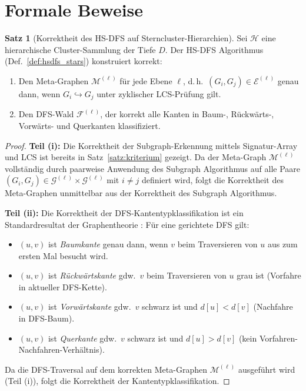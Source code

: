 ﻿\documentclass[a4paper,12pt]{report}
\theoremstyle{definition}
\newtheorem{satz}{Satz}
\begin{document}
\section{Formale Beweise}
\label{ssec:hsdfs_beweise}

\begin{satz}[Korrektheit des HS-DFS auf Sterncluster-Hierarchien]
\label{satz:hsdfs_korrektheit}
Sei $\mathcal{H}$ eine hierarchische Cluster-Sammlung der Tiefe $D$. Der HS-DFS Algorithmus (Def.~\ref{def:hsdfs_stars}) konstruiert korrekt:
\begin{enumerate}[label=(\roman*)]
    \item Den Meta-Graphen $\mathcal{M}^{(\ell)}$ für jede Ebene $\ell$, d.\,h.\ $(G_i, G_j) \in \mathcal{E}^{(\ell)}$ genau dann, wenn $G_i \hookrightarrow G_j$ unter zyklischer LCS-Prüfung gilt.
    \item Den DFS-Wald $\mathcal{F}^{(\ell)}$, der korrekt alle Kanten in Baum-, Rückwärts-, Vorwärts- und Querkanten klassifiziert.
\end{enumerate}
\end{satz}

\begin{proof}
\textbf{Teil (i):} Die Korrektheit der Subgraph-Erkennung mittels Signatur-Array und LCS ist bereits in Satz~\ref{satz:kriterium} gezeigt. Da der Meta-Graph $\mathcal{M}^{(\ell)}$ vollständig durch paarweise Anwendung des Subgraph Algorithmus auf alle Paare $(G_i, G_j) \in \mathcal{G}^{(\ell)} \times \mathcal{G}^{(\ell)}$ mit $i \neq j$ definiert wird, folgt die Korrektheit des Meta-Graphen unmittelbar aus der Korrektheit des Subgraph Algorithmus.

\textbf{Teil (ii):} Die Korrektheit der DFS-Kantentypklassifikation ist ein Standardresultat der Graphentheorie \cite{cormen2009}: Für eine gerichtete DFS gilt:
\begin{itemize}
    \item $(u,v)$ ist \emph{Baumkante} genau dann, wenn $v$ beim Traversieren von $u$ aus zum ersten Mal besucht wird.
    \item $(u,v)$ ist \emph{Rückwärtskante} gdw.\ $v$ beim Traversieren von $u$ grau ist (Vorfahre in aktueller DFS-Kette).
    \item $(u,v)$ ist \emph{Vorwärtskante} gdw.\ $v$ schwarz ist und $d[u] < d[v]$ (Nachfahre in DFS-Baum).
    \item $(u,v)$ ist \emph{Querkante} gdw.\ $v$ schwarz ist und $d[u] > d[v]$ (kein Vorfahren-Nachfahren-Verhältnis).
\end{itemize}
Da die DFS-Traversal auf dem korrekten Meta-Graphen $\mathcal{M}^{(\ell)}$ ausgeführt wird (Teil (i)), folgt die Korrektheit der Kantentypklassifikation.
\end{proof}
\end{document}
